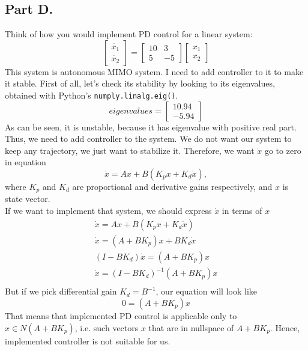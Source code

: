 \documentclass[a4paper,12pt]{article}
\begin{document}
    \subsection*{Part D.}
    Think of how you would implement PD control for a linear system:
    \begin{equation*}
        \begin{bmatrix}
            \dot{x_1}\\
            \dot{x_2}
        \end{bmatrix}
        = 
        \begin{bmatrix}
            10 & 3 \\
            5 & -5
        \end{bmatrix}
        \begin{bmatrix}
            x_1\\
            x_2
        \end{bmatrix}
    \end{equation*}
    This system is autonomous MIMO system. I need to add controller to it to 
    make it stable. First of all, let's check its stability by looking to its 
    eigenvalues, obtained with Python's \texttt{numply.linalg.eig()}.
    \begin{equation*}
        eigenvalues = 
        \begin{bmatrix}
            10.94\\
            -5.94
        \end{bmatrix}
    \end{equation*}
    As can be seen, it is unstable, because it has eigenvalue with positive
    real part. Thus, we need to add controller to the system. We do not want our 
    system to keep any trajectory, we just want to stabilize it. Therefore, we 
    want $\dot{x}$ go to zero in equation
    \begin{equation*}
        \dot{x} = Ax + B(K_px + K_d\dot{x}),
    \end{equation*}
    where $K_p$ and $K_d$ are proportional and derivative gains respectively, and
    $x$ is state vector.\\
    If we want to implement that system, we should express $\dot{x}$ in terms of
    $x$
    \begin{eqnarray*}
        \dot{x} = Ax + B(K_px + K_d\dot{x})\\
        \dot{x} = (A + BK_p)x + BK_d\dot{x}\\
        (I-BK_d)\dot{x}= (A + BK_p)x\\
        \dot{x}= (I-BK_d)^{-1}(A + BK_p)x\\
    \end{eqnarray*}
    But if we pick differential gain $K_d = B^{-1}$, our equation will look like
    \begin{equation*}
        0 = (A + BK_p)x
    \end{equation*}
    That means that implemented PD control is applicable only to $x \in N(A+BK_p)$,
    i.e. such vectors $x$ that are in nullspace of $A+BK_p$. Hence, implemented 
    controller is not suitable for us. 
\end{document}
